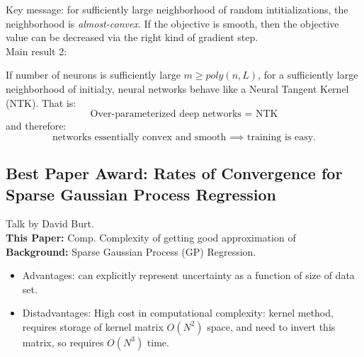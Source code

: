 Key message: for sufficiently large neighborhood of random intitializations, the neighborhood is {\it almost-convex}. If the objective is smooth, then the objective value can be decreased via the right kind of gradient step. \\

Main result 2:
\begin{theorem}
If number of neurons is sufficiently large $m \geq poly(n,L)$, for a sufficiently large neighborhood of initial;y, neural networks behave like a Neural Tangent Kernel (NTK). That is:
\[
\text{Over-parameterized deep networks = NTK}
\]
and therefore:
\[
\text{networks essentially convex and smooth $\implies$ training is easy.}
\]
\end{theorem}


\spacerule








\spacerule


\subsection{Best Paper Award: Rates of Convergence for Sparse Gaussian Process Regression}

Talk by David Burt. \\

{\bf This Paper:} Comp. Complexity of getting good approximation of \\

{\bf Background:} Sparse Gaussian Process (GP) Regression. \\

\begin{itemize}
    \item Advantages: can explicitly represent uncertainty as a function of size of data set.
    \item Distadvantages: High cost in computational complexity: kernel method, requires storage of kernel matrix $O(N^2)$ space, and need to invert this matrix, so requires $O(N^3)$ time.
\end{itemize}

